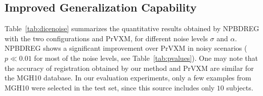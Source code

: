 \documentclass[preprint,authoryear]{elsarticle}
\begin{document}
 \subsection{Improved Generalization Capability}
 Table~\ref{tab:dicenoise} summarizes the quantitative results obtained by NPBDREG with the two configurations and PrVXM, for different noise levels $\sigma$ and $\alpha$. NPBDREG  shows a significant improvement over PrVXM in noisy scenarios ($p \ll 0.01$ for most of the noise levels, see Table~\ref{tab:pvalues}). One may note that the accuracy of registration obtained by our method and PrVXM are similar for the MGH10 database. In our evaluation experiments, only a few examples from MGH10 were selected in the test set, since this source includes only $10$ subjects. 
\begin{table}[t!]
\centering
{}
\caption{Registration robustness to noise evaluation results. The added noise levels are denoted by $\sigma$ and $\alpha$, respectively. The mean and std of the Dice metric, calculated over the whole test set and over labels, are presented for the three different models (from top to bottom: NPBDREG with configurations (1) and (2) and the baseline PrVXM, respectively. }\label{tab:dicenoise}
\end{table}
\end{document}
